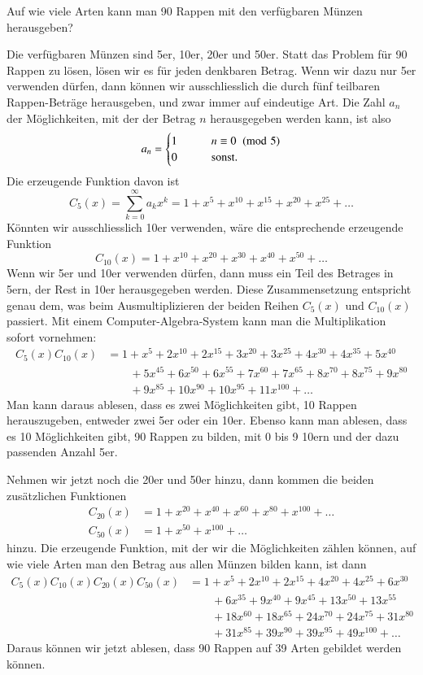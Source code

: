 \begin{beispiele}
\item 
Auf wie viele Arten kann man 90 Rappen mit den verfügbaren Münzen
herausgeben?

Die verfügbaren Münzen sind 5er, 10er, 20er und 50er.
Statt das Problem für 90 Rappen zu lösen, lösen wir es für jeden
denkbaren Betrag.
Wenn wir dazu nur 5er verwenden dürfen, dann können wir ausschliesslich
die durch fünf teilbaren Rappen-Beträge herausgeben, und zwar immer
auf eindeutige Art.
Die Zahl $a_n$ der Möglichkeiten, mit der der Betrag
$n$ herausgegeben werden kann, ist also
\[
a_n = \begin{cases}
1&\qquad n\equiv 0\imod{5}\\
0&\qquad \text{sonst}.
\end{cases}
\]
Die erzeugende Funktion davon ist
\[
C_5(x)=\sum_{k=0}^\infty a_kx^k=1+x^5+x^{10}+x^{15}+x^{20}+x^{25}+\dots
\]
Könnten wir ausschliesslich 10er verwenden, wäre die entsprechende
erzeugende Funktion
\[
C_{10}(x)=1+x^{10}+x^{20}+x^{30}+x^{40}+x^{50}+\dots
\]
Wenn wir 5er und 10er verwenden dürfen, dann muss ein Teil des Betrages
in 5ern, der Rest in 10er herausgegeben werden.
Diese Zusammensetzung entspricht genau dem, was beim Ausmultiplizieren
der beiden Reihen $C_5(x)$ und $C_{10}(x)$ passiert.
Mit einem Computer-Algebra-System kann man die Multiplikation sofort vornehmen:
\begin{align*}
C_5(x)C_{10}(x)&=
 1+x^5+2 x^{10}+2 x^{15}+3 x^{20}+3 x^{25}+4 x^{30}+4 x^{35}+5 x^{40}\\
&\qquad +5 x^{45} +6 x^{50}+6 x^{55}+7 x^{60}+7 x^{65}+8 x^{70}+8 x^{75}+9 x^{80}\\
&\qquad +9 x^{85}+10 x^{90}+10 x^{95}+11 x^{100}+\dots
\end{align*}
Man kann daraus ablesen, dass es zwei Möglichkeiten gibt, 10 Rappen
herauszugeben, entweder zwei 5er oder ein 10er.
Ebenso kann man ablesen,
dass es 10 Möglichkeiten gibt, 90 Rappen zu bilden, mit 0 bis 9 10ern
und der dazu passenden Anzahl 5er.

Nehmen wir jetzt noch die 20er und 50er hinzu, dann kommen die beiden
zusätzlichen Funktionen
\begin{align*}
C_{20}(x)&= 1+x^{20}+x^{40}+x^{60}+x^{80}+x^{100}+\dots\\
C_{50}(x)&=1+x^{50}+x^{100}+\dots
\end{align*}
hinzu.
Die erzeugende Funktion, mit der wir die Möglichkeiten zählen
können, auf wie viele Arten man den Betrag aus allen Münzen bilden kann,
ist dann
\begin{align*}
C_5(x) C_{10}(x) C_{20}(x) C_{50}(x)
&=
1+x^5+2 x^{10}+2 x^{15}+4 x^{20}+4 x^{25}+6 x^{30}\\
&\qquad
+6 x^{35} +9 x^{40} +9 x^{45}+13 x^{50}+13 x^{55}\\
&\qquad
+18 x^{60}+18 x^{65} +24 x^{70}+24 x^{75}+31 x^{80}\\
&\qquad
+31 x^{85}+39 x^{90}+39 x^{95} +49 x^{100}+\dots
\end{align*}
Daraus können wir jetzt ablesen, dass 90 Rappen auf 39 Arten
gebildet werden können.
\end{beispiele}

